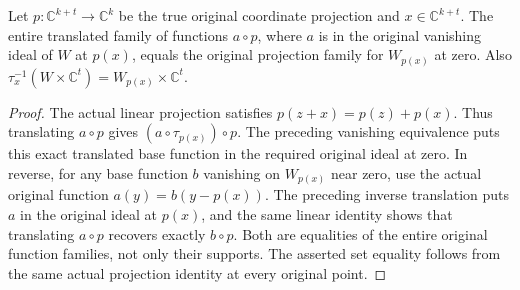 \begin{lemma}
\label{hir:actual-cylinder-pullback-family-translation}
\leanok
Let $p:\mathbb C^{k+t}\to\mathbb C^k$ be the true original coordinate
projection and $x\in\mathbb C^{k+t}$. The entire translated family of
functions $a\circ p$, where $a$ is in the original vanishing ideal of
$W$ at $p(x)$, equals the original projection family for
$W_{p(x)}$ at zero. Also
$\tau_x^{-1}(W\times\mathbb C^t)=W_{p(x)}\times\mathbb C^t$.
\end{lemma}
\begin{proof}
The actual linear projection satisfies $p(z+x)=p(z)+p(x)$.
Thus translating $a\circ p$ gives $(a\circ\tau_{p(x)})\circ p$.
The preceding vanishing equivalence puts this exact translated base
function in the required original ideal at zero. In reverse, for any
base function $b$ vanishing on $W_{p(x)}$ near zero, use the actual
original function $a(y)=b(y-p(x))$. The preceding inverse translation
puts $a$ in the original ideal at $p(x)$, and the same linear identity
shows that translating $a\circ p$ recovers exactly $b\circ p$.
Both are equalities of the entire original function families, not
only their supports. The asserted set equality follows from the same
actual projection identity at every original point.
\end{proof}

